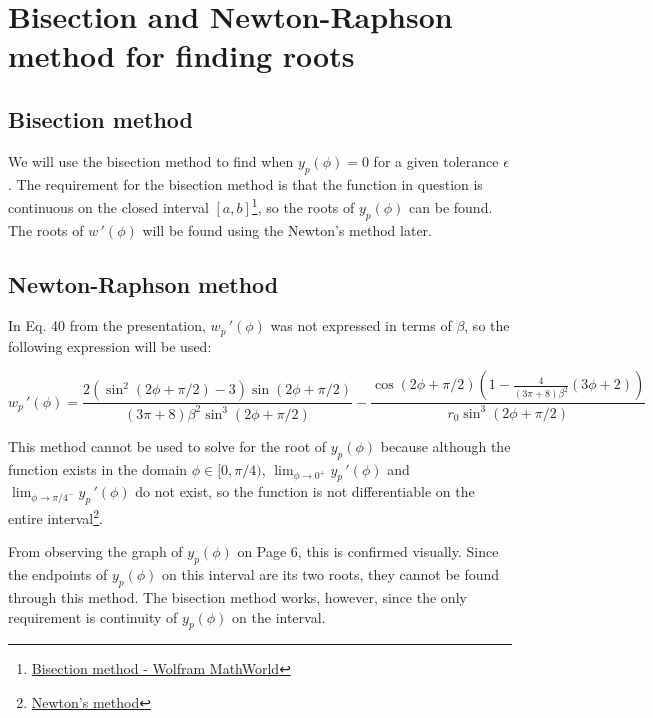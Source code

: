 \section{Bisection and Newton-Raphson method for finding roots}

\subsection{Bisection method}

We will use the bisection method to find when $y_p(\phi)=0$ for a given tolerance $\epsilon$. 
The requirement for the bisection method is that the function in question is continuous on the closed interval $[a,b]$\footnote{\href{https://mathworld.wolfram.com/Bisection.html}{Bisection method - Wolfram MathWorld}}, so the roots of $y_p(\phi)$ can be found. The roots of $w\,'(\phi)$ will be found using the Newton's method later.

\subsection{Newton-Raphson method}

In Eq. 40 from the presentation, $w_p\,'(\phi)$ was not expressed in terms of $\beta$, 
so the following expression will be used:

\begin{equation}
    w_p\,'(\phi)=\frac{2(\sin^2(2\phi+\pi/2)-3)\sin(2\phi+\pi/2)}{(3\pi+8)\beta^2\sin^3(2\phi+\pi/2)}
    -\frac{\cos(2\phi+\pi/2)\left(1-\frac{4}{(3\pi+8)\beta^2}(3\phi+2)\right)}{r_0\sin^3(2\phi+\pi/2)}
\end{equation}

This method cannot be used to solve for the root of $y_p(\phi)$ because although the function exists in the domain $\phi\in[0,\pi/4)$,
$\lim_{\phi\to 0^+}y_p\,'(\phi)$ and $\lim_{\phi\to \pi/4^-}y_p\,'(\phi)$ do not exist, so the function is not differentiable on the entire interval\footnote{\href{http://amsi.org.au/ESA_Senior_Years/SeniorTopic3/3j/3j_2content_2.html}{Newton's method}}.

From observing the graph of $y_p(\phi)$ on Page 6, this is confirmed visually. Since the endpoints of $y_p(\phi)$ on this interval are its two roots,
they cannot be found through this method. The bisection method works, however, since the only requirement is continuity of $y_p(\phi)$ on the interval.

